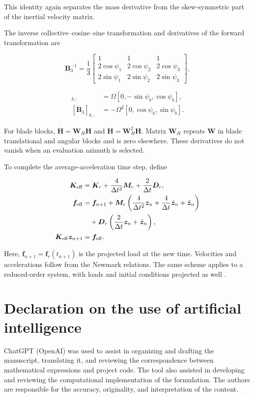 This identity again separates the mass derivative from the skew-symmetric part of the inertial velocity matrix.

The inverse collective--cosine--sine transformation and derivatives of the forward transformation are

\begin{equation}
\bm B_3^{-1}=\frac13\begin{bmatrix}
1&1&1\\2\cos\psi_1&2\cos\psi_2&2\cos\psi_3\\
2\sin\psi_1&2\sin\psi_2&2\sin\psi_3
\end{bmatrix},
\end{equation}

\begin{align}
[\dot{\bm B}_3]_{b,:}&=\Omega[0,-\sin\psi_b,\cos\psi_b],\nonumber\\
[\ddot{\bm B}_3]_{b,:}&=-\Omega^2[0,\cos\psi_b,\sin\psi_b].
\end{align}

For blade blocks, $\dot{\bm H}=\bm W_H\bm H$ and $\ddot{\bm H}=\bm W_H^2\bm H$. Matrix $\bm W_H$ repeats $\bm W$ in blade translational and angular blocks and is zero elsewhere. These derivatives do not vanish when an evaluation azimuth is selected.

To complete the average-acceleration time step, define

\begin{align}
\bm K_{\rm eff}&=\bm K_r+\frac4{\Delta t^2}\bm M_r+\frac2{\Delta t}\bm D_r,\nonumber\\
\bm f_{\rm eff}&=\bm f_{n+1}
+\bm M_r\left(\frac4{\Delta t^2}\bm z_n+\frac4{\Delta t}\dot{\bm z}_n+\ddot{\bm z}_n\right)\nonumber\\
&\quad+\bm D_r\left(\frac2{\Delta t}\bm z_n+\dot{\bm z}_n\right),\nonumber\\
\bm K_{\rm eff}\bm z_{n+1}&=\bm f_{\rm eff}.
\end{align}

Here, $\bm f_{n+1}=\bm f_r(t_{n+1})$ is the projected load at the new time. Velocities and accelerations follow from the Newmark relations. The same scheme applies to a reduced-order system, with loads and initial conditions projected as well \citep{newmark1971}.

\section{Declaration on the use of artificial intelligence}
ChatGPT (OpenAI) was used to assist in organizing and drafting the manuscript, translating it, and reviewing the correspondence between mathematical expressions and project code. The tool also assisted in developing and reviewing the computational implementation of the formulation. The authors are responsible for the accuracy, originality, and interpretation of the content.
